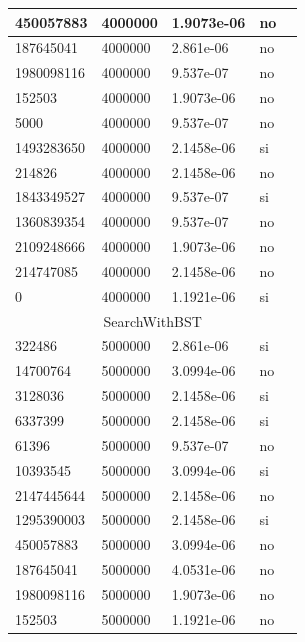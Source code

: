 \documentclass[12pt, fleqn]{article}                             %
\theoremstyle{break}                                            %
\begin{document}
\begin{longtable}{|m{5em}|m{5em}|m{10em}|m{5em}|@{}m{0pt}@{}}
            450057883& 4000000  & 1.9073e-06 & no &\\[1em]    \hline
            187645041& 4000000  & 2.861e-06 & no &\\[1em]    \hline
            1980098116& 4000000  & 9.537e-07 & no &\\[1em]    \hline
            152503& 4000000  & 1.9073e-06 & no &\\[1em]    \hline
            5000& 4000000  & 9.537e-07 & no &\\[1em]    \hline
            1493283650& 4000000  & 2.1458e-06 & si &\\[1em]    \hline
            214826& 4000000  & 2.1458e-06 & no &\\[1em]    \hline
            1843349527& 4000000  & 9.537e-07 & si &\\[1em]    \hline
            1360839354& 4000000  & 9.537e-07 & no &\\[1em]    \hline
            2109248666& 4000000  & 1.9073e-06 & no &\\[1em]    \hline
            214747085& 4000000  & 2.1458e-06 & no &\\[1em]    \hline
            0& 4000000  & 1.1921e-06 & si &\\[1em]    \hline
            \multicolumn{5}{|c|}{SearchWithBST}   \\          \hline
            322486& 5000000  & 2.861e-06 & si &\\[1em]    \hline
            14700764& 5000000  & 3.0994e-06 & no &\\[1em]    \hline
            3128036& 5000000  & 2.1458e-06 & si &\\[1em]    \hline
            6337399& 5000000  & 2.1458e-06 & si &\\[1em]    \hline
            61396& 5000000  & 9.537e-07 & no &\\[1em]    \hline
            10393545& 5000000  & 3.0994e-06 & si &\\[1em]    \hline
            2147445644& 5000000  & 2.1458e-06 & no &\\[1em]    \hline
            1295390003& 5000000  & 2.1458e-06 & si &\\[1em]    \hline
            450057883& 5000000  & 3.0994e-06 & no &\\[1em]    \hline
            187645041& 5000000  & 4.0531e-06 & no &\\[1em]    \hline
            1980098116& 5000000  & 1.9073e-06 & no &\\[1em]    \hline
            152503& 5000000  & 1.1921e-06 & no &\\[1em]    \hline

\end{longtable}
\end{document}
